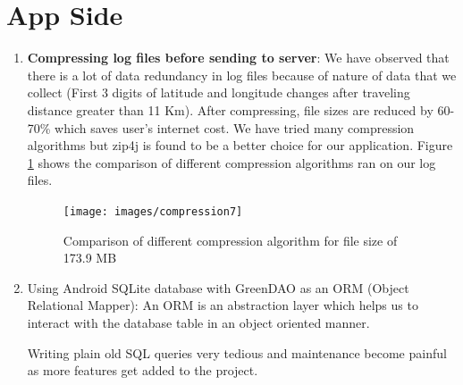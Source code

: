 \documentclass[12pt]{report}
\begin{document}
\section{App Side}
\label{sec:app_side}
\begin{enumerate}
\item \textbf{Compressing log files before sending to server}: We have observed
  that there is a lot of data redundancy in log files because of nature of
  data that we collect (First 3 digits of latitude and longitude changes after
  traveling distance greater than 11 Km). After compressing, file sizes are
  reduced by 60-70\% which saves user's internet cost. We have tried many
  compression algorithms but zip4j is found to be a better choice for our
  application. Figure \ref{compression} shows the comparison of different
  compression algorithms ran on our log files.
  \begin{figure}[h]
    \centering
    \texttt{[image: images/compression7]}
    \caption{Comparison of different compression algorithm for file size of 173.9 MB}
    \label{compression}
  \end{figure}



 
\item Using Android SQLite database with GreenDAO \cite{greendao} as an ORM
  (Object Relational Mapper): An ORM is an abstraction layer which helps us to
  interact with the database table in an object oriented manner.

  Writing plain old SQL queries very tedious and maintenance become painful as
  more features get added to the project.



\end{enumerate}
\end{document}
